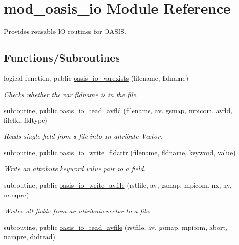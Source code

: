 \hypertarget{namespacemod__oasis__io}{}\section{mod\+\_\+oasis\+\_\+io Module Reference}
\label{namespacemod__oasis__io}


Provides reusable IO routines for O\+A\+S\+IS.  


\subsection*{Functions/\+Subroutines}
\begin{DoxyCompactItemize}
\item 
logical function, public \hyperlink{namespacemod__oasis__io_a4d0f5cb29eabc798e857127c8c174d85}{oasis\+\_\+io\+\_\+varexists} (filename, fldname)
\begin{DoxyCompactList}\small\item\em Checks whether the var fldname is in the file. \end{DoxyCompactList}\item 
subroutine, public \hyperlink{namespacemod__oasis__io_a6c14bebb7b216218e25f599e3469ae0c}{oasis\+\_\+io\+\_\+read\+\_\+avfld} (filename, av, gsmap, mpicom, avfld, filefld, fldtype)
\begin{DoxyCompactList}\small\item\em Reads single field from a file into an attribute Vector. \end{DoxyCompactList}\item 
subroutine, public \hyperlink{namespacemod__oasis__io_a9166ac9efbdf1146dc3c64677fd411b7}{oasis\+\_\+io\+\_\+write\+\_\+fldattr} (filename, fldname, keyword, value)
\begin{DoxyCompactList}\small\item\em Write an attribute keyword value pair to a field. \end{DoxyCompactList}\item 
subroutine, public \hyperlink{namespacemod__oasis__io_ad8a48d6c36e3fac637a8191c20e514f2}{oasis\+\_\+io\+\_\+write\+\_\+avfile} (rstfile, av, gsmap, mpicom, nx, ny, nampre)
\begin{DoxyCompactList}\small\item\em Writes all fields from an attribute vector to a file. \end{DoxyCompactList}\item 
subroutine, public \hyperlink{namespacemod__oasis__io_a65e17e4a065e8e4dea33754fb9c1d32c}{oasis\+\_\+io\+\_\+read\+\_\+avfile} (rstfile, av, gsmap, mpicom, abort, nampre, didread)

\end{DoxyCompactItemize}
